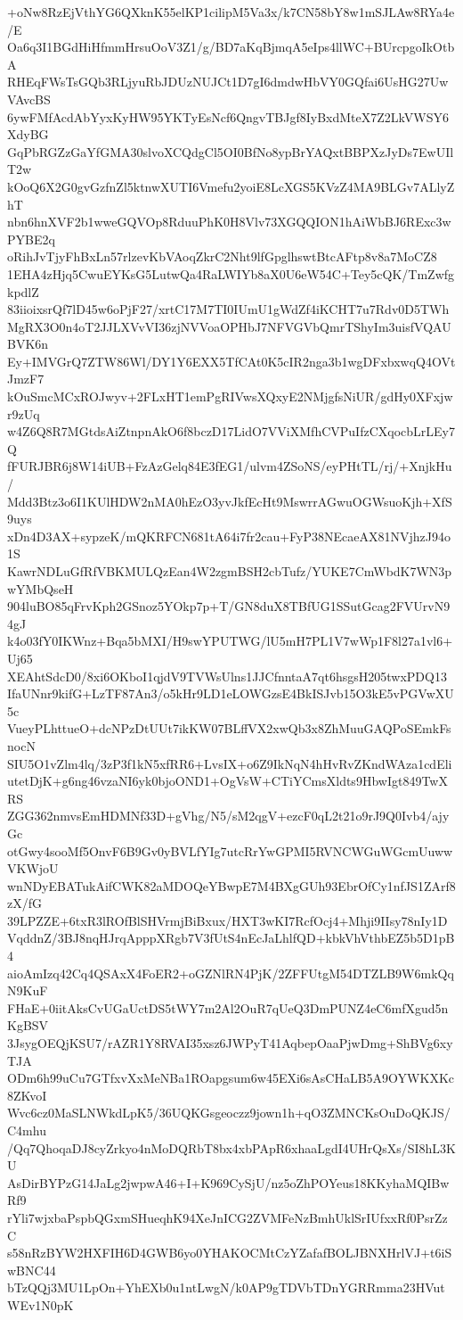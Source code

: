 +oNw8RzEjVthYG6QXknK55elKP1cilipM5Va3x/k7CN58bY8w1mSJLAw8RYa4e/E
Oa6q3I1BGdHiHfmmHrsuOoV3Z1/g/BD7aKqBjmqA5eIps4llWC+BUrcpgoIkOtbA
RHEqFWsTsGQb3RLjyuRbJDUzNUJCt1D7gI6dmdwHbVY0GQfai6UsHG27UwVAvcBS
6ywFMfAcdAbYyxKyHW95YKTyEsNcf6QngvTBJgf8IyBxdMteX7Z2LkVWSY6XdyBG
GqPbRGZzGaYfGMA30slvoXCQdgCl5OI0BfNo8ypBrYAQxtBBPXzJyDs7EwUIlT2w
kOoQ6X2G0gvGzfnZl5ktnwXUTI6Vmefu2yoiE8LcXGS5KVzZ4MA9BLGv7ALlyZhT
nbn6hnXVF2b1wweGQVOp8RduuPhK0H8Vlv73XGQQION1hAiWbBJ6RExc3wPYBE2q
oRihJvTjyFhBxLn57rlzevKbVAoqZkrC2Nht9lfGpglhswtBtcAFtp8v8a7MoCZ8
1EHA4zHjq5CwuEYKsG5LutwQa4RaLWIYb8aX0U6eW54C+Tey5cQK/TmZwfgkpdlZ
83iioixsrQf7lD45w6oPjF27/xrtC17M7TI0IUmU1gWdZf4iKCHT7u7Rdv0D5TWh
MgRX3O0n4oT2JJLXVvVI36zjNVVoaOPHbJ7NFVGVbQmrTShyIm3uisfVQAUBVK6n
Ey+IMVGrQ7ZTW86Wl/DY1Y6EXX5TfCAt0K5cIR2nga3b1wgDFxbxwqQ4OVtJmzF7
kOuSmcMCxROJwyv+2FLxHT1emPgRIVwsXQxyE2NMjgfsNiUR/gdHy0XFxjwr9zUq
w4Z6Q8R7MGtdsAiZtnpnAkO6f8bczD17LidO7VViXMfhCVPuIfzCXqocbLrLEy7Q
fFURJBR6j8W14iUB+FzAzGelq84E3fEG1/ulvm4ZSoNS/eyPHtTL/rj/+XnjkHu/
Mdd3Btz3o6I1KUlHDW2nMA0hEzO3yvJkfEcHt9MswrrAGwuOGWsuoKjh+XfS9uys
xDn4D3AX+sypzeK/mQKRFCN681tA64i7fr2cau+FyP38NEcaeAX81NVjhzJ94o1S
KawrNDLuGfRfVBKMULQzEan4W2zgmBSH2cbTufz/YUKE7CmWbdK7WN3pwYMbQseH
904luBO85qFrvKph2GSnoz5YOkp7p+T/GN8duX8TBfUG1SSutGcag2FVUrvN94gJ
k4o03fY0IKWnz+Bqa5bMXI/H9swYPUTWG/lU5mH7PL1V7wWp1F8l27a1vl6+Uj65
XEAhtSdcD0/8xi6OKboI1qjdV9TVWsUlns1JJCfnntaA7qt6hsgsH205twxPDQ13
IfaUNnr9kifG+LzTF87An3/o5kHr9LD1eLOWGzsE4BkISJvb15O3kE5vPGVwXU5c
VueyPLhttueO+dcNPzDtUUt7ikKW07BLffVX2xwQb3x8ZhMuuGAQPoSEmkFsnocN
SIU5O1vZlm4lq/3zP3f1kN5xfRR6+LvsIX+o6Z9IkNqN4hHvRvZKndWAza1cdEli
utetDjK+g6ng46vzaNI6yk0bjoOND1+OgVsW+CTiYCmsXldts9HbwIgt849TwXRS
ZGG362nmvsEmHDMNf33D+gVhg/N5/sM2qgV+ezcF0qL2t21o9rJ9Q0Ivb4/ajyGc
otGwy4sooMf5OnvF6B9Gv0yBVLfYIg7utcRrYwGPMI5RVNCWGuWGcmUuwwVKWjoU
wnNDyEBATukAifCWK82aMDOQeYBwpE7M4BXgGUh93EbrOfCy1nfJS1ZArf8zX/fG
39LPZZE+6txR3lROfBlSHVrmjBiBxux/HXT3wKI7RcfOcj4+Mhji9IIsy78nIy1D
VqddnZ/3BJ8nqHJrqApppXRgb7V3fUtS4nEcJaLhlfQD+kbkVhVthbEZ5b5D1pB4
aioAmIzq42Cq4QSAxX4FoER2+oGZNlRN4PjK/2ZFFUtgM54DTZLB9W6mkQqN9KuF
FHaE+0iitAksCvUGaUctDS5tWY7m2Al2OuR7qUeQ3DmPUNZ4eC6mfXgud5nKgBSV
3JsygOEQjKSU7/rAZR1Y8RVAI35xsz6JWPyT41AqbepOaaPjwDmg+ShBVg6xyTJA
ODm6h99uCu7GTfxvXxMeNBa1ROapgsum6w45EXi6sAsCHaLB5A9OYWKXKc8ZKvoI
Wvc6cz0MaSLNWkdLpK5/36UQKGsgeoczz9jown1h+qO3ZMNCKsOuDoQKJS/C4mhu
/Qq7QhoqaDJ8cyZrkyo4nMoDQRbT8bx4xbPApR6xhaaLgdI4UHrQsXs/SI8hL3KU
AsDirBYPzG14JaLg2jwpwA46+I+K969CySjU/nz5oZhPOYeus18KKyhaMQIBwRf9
rYli7wjxbaPspbQGxmSHueqhK94XeJnICG2ZVMFeNzBmhUklSrIUfxxRf0PsrZzC
s58nRzBYW2HXFIH6D4GWB6yo0YHAKOCMtCzYZafafBOLJBNXHrlVJ+t6iSwBNC44
bTzQQj3MU1LpOn+YhEXb0u1ntLwgN/k0AP9gTDVbTDnYGRRmma23HVutWEv1N0pK
